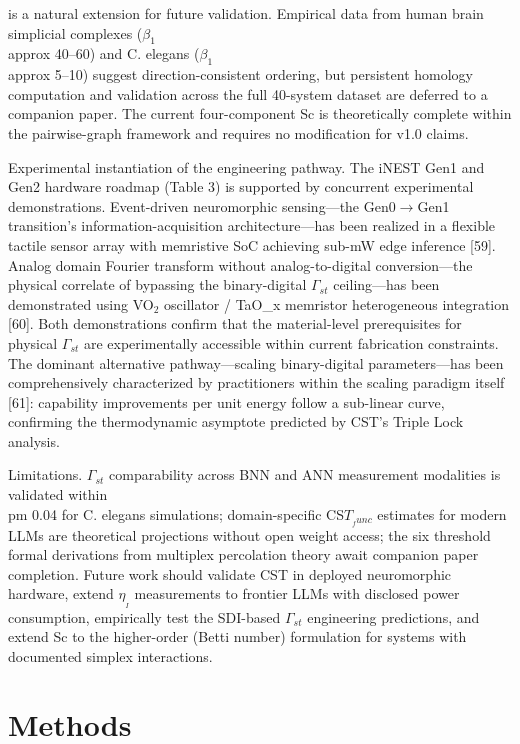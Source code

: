 \documentclass[a4paper,12pt]{article}
\begin{document}
is a natural extension for future validation. Empirical data from human brain simplicial complexes ($\beta_1$  \\approx  40--60) and C. elegans ($\beta_1$  \\approx  5--10) suggest direction-consistent ordering, but persistent homology computation and validation across the full 40-system dataset are deferred to a companion paper. The current four-component Sc is theoretically complete within the pairwise-graph framework and requires no modification for v1.0 claims.


Experimental instantiation of the engineering pathway. The iNEST Gen1 and Gen2 hardware roadmap (Table 3) is supported by concurrent experimental demonstrations. Event-driven neuromorphic sensing---the Gen0$\rightarrow$Gen1 transition's information-acquisition architecture---has been realized in a flexible tactile sensor array with memristive SoC achieving sub-mW edge inference [59]. Analog domain Fourier transform without analog-to-digital conversion---the physical correlate of bypassing the binary-digital $\Gamma_{st}$ ceiling---has been demonstrated using VO$_2$ oscillator / TaO_{x} memristor heterogeneous integration [60]. Both demonstrations confirm that the material-level prerequisites for physical $\Gamma_{st}$ are experimentally accessible within current fabrication constraints. The dominant alternative pathway---scaling binary-digital parameters---has been comprehensively characterized by practitioners within the scaling paradigm itself [61]: capability improvements per unit energy follow a sub-linear curve, confirming the thermodynamic asymptote predicted by CST's Triple Lock analysis.


Limitations. $\Gamma_{st}$ comparability across BNN and ANN measurement modalities is validated within  \\pm 0.04 for C. elegans simulations; domain-specific CS$T_{_func}$ estimates for modern LLMs are theoretical projections without open weight access; the six threshold formal derivations from multiplex percolation theory await companion paper completion. Future work should validate CST in deployed neuromorphic hardware, extend $\eta_{_I}$ measurements to frontier LLMs with disclosed power consumption, empirically test the SDI-based $\Gamma_{st}$ engineering predictions, and extend Sc to the higher-order (Betti number) formulation for systems with documented simplex interactions.



\section{Methods}
\end{document}
